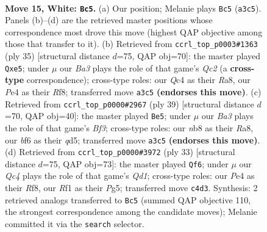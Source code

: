 \documentclass[11pt]{article}
\begin{document}
\clearpage

\begin{figure}[p]\centering
\begin{subfigure}{0.46\textwidth}\centering
\resizebox{\linewidth}{!}{%
\newchessgame
\chessboard[
  setfen={rn3rk1/p1p1pp1p/5bp1/3P4/2Q1P3/B1P4q/P4P1P/R4RK1 w - - 0 15},
  showmover=false,
  pgfstyle=straightmove, color=movearrow, markmove={a3-c5}
]}
\caption{}
\end{subfigure}\hfill
\begin{subfigure}{0.46\textwidth}\centering
\resizebox{\linewidth}{!}{%
\newchessgame
\chessboard[
  setfen={r4rk1/ppq2p1p/6p1/2b1P2n/R1B2p2/2N2Q2/PPP3PP/2K4R b - - 0 18},
  showmover=false,
  pgfstyle=straightmove, color=movearrow, markmove={c7-e5}
]}
\caption{}
\end{subfigure}
\\[4pt]
\begin{subfigure}{0.46\textwidth}\centering
\resizebox{\linewidth}{!}{%
\newchessgame
\chessboard[
  setfen={rq3rk1/1p3ppp/p4b2/3Q4/4N1b1/P7/1PP2PPP/R1B1R1K1 b - - 0 20},
  showmover=false,
  pgfstyle=straightmove, color=movearrow, markmove={f6-e5}
]}
\caption{}
\end{subfigure}\hfill
\begin{subfigure}{0.46\textwidth}\centering
\resizebox{\linewidth}{!}{%
\newchessgame
\chessboard[
  setfen={r2q1rk1/p2p1p2/bp5p/3Q2p1/2P5/P5B1/1P3PPP/R4RK1 b - - 0 17},
  showmover=false,
  pgfstyle=straightmove, color=movearrow, markmove={d8-f6}
]}
\caption{}
\end{subfigure}
\caption{\textbf{Move 15, White: \texttt{Bc5}.} (a) Our position; Melanie plays \texttt{Bc5} (\texttt{a3c5}). Panels (b)--(d) are the retrieved master positions whose correspondence most drove this move (highest QAP objective among those that transfer to it). (b) Retrieved from \texttt{ccrl\_top\_p0003\#1363} (ply 35) [structural distance $d$=75, QAP obj=70]: the master played \texttt{Qxe5}; under $\mu$ our \emph{Ba3} plays the role of that game's \emph{Qc2} (a \textbf{cross-type} correspondence); cross-type roles: our \emph{Q}c4 as their \emph{R}a8, our \emph{P}e4 as their \emph{R}f8; transferred move \texttt{a3c5} \textbf{(endorses this move)}. (c) Retrieved from \texttt{ccrl\_top\_p0000\#2967} (ply 39) [structural distance $d$=70, QAP obj=40]: the master played \texttt{Be5}; under $\mu$ our \emph{Ba3} plays the role of that game's \emph{Bf3}; cross-type roles: our \emph{n}b8 as their \emph{R}a8, our \emph{b}f6 as their \emph{q}d5; transferred move \texttt{a3c5} \textbf{(endorses this move)}. (d) Retrieved from \texttt{ccrl\_top\_p0000\#3972} (ply 33) [structural distance $d$=75, QAP obj=73]: the master played \texttt{Qf6}; under $\mu$ our \emph{Qc4} plays the role of that game's \emph{Qd1}; cross-type roles: our \emph{P}e4 as their \emph{R}f8, our \emph{R}f1 as their \emph{P}g5; transferred move \texttt{c4d3}. Synthesis: 2 retrieved analogs transferred to \texttt{Bc5} (summed QAP objective 110, the strongest correspondence among the candidate moves); Melanie committed it via the \texttt{search} selector.}
\label{fig:thought-m28}
\end{figure}
\end{document}
